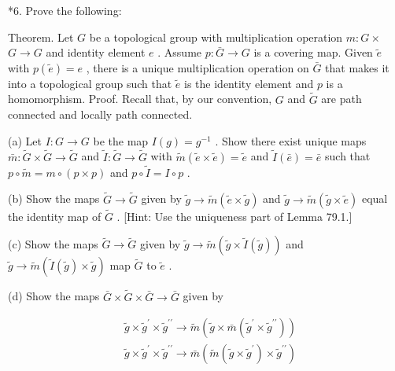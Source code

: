 *6. Prove the following:

Theorem. Let \(G\) be a topological group with multiplication operation \(m : G \times\)  \(G \rightarrow  G\) and identity element \(e\) . Assume \(p : \bar{G} \rightarrow  G\) is a covering map. Given \(\widetilde{e}\) with \(p\left( \widetilde{e}\right)  = e\) , there is a unique multiplication operation on \(\bar{G}\) that makes it into a topological group such that \(\widetilde{e}\) is the identity element and \(p\) is a homomorphism. Proof. Recall that, by our convention, \(G\) and \(\widetilde{G}\) are path connected and locally path connected.

(a) Let \(I : G \rightarrow  G\) be the map \(I\left( g\right)  = {g}^{-1}\) . Show there exist unique maps \(\bar{m} : \widetilde{G} \times  \widetilde{G} \rightarrow  \widetilde{G}\) and \(\widetilde{I} : \widetilde{G} \rightarrow  \widetilde{G}\) with \(\widetilde{m}\left( {\widetilde{e} \times  \widetilde{e}}\right)  = \widetilde{e}\) and \(\widetilde{I}\left( \bar{e}\right)  = \bar{e}\) such that \(p \circ  \widetilde{m} = m \circ  \left( {p \times  p}\right)\) and \(p \circ  \widetilde{I} = I \circ  p\) .

(b) Show the maps \(\widetilde{G} \rightarrow  \widetilde{G}\) given by \(\widetilde{g} \rightarrow  \widetilde{m}\left( {\widetilde{e} \times  \widetilde{g}}\right)\) and \(\widetilde{g} \rightarrow  \widetilde{m}\left( {\widetilde{g} \times  \widetilde{e}}\right)\) equal the identity map of \(\widetilde{G}\) . [Hint: Use the uniqueness part of Lemma 79.1.]

(c) Show the maps \(\widetilde{G} \rightarrow  \widetilde{G}\) given by \(\widetilde{g} \rightarrow  \widetilde{m}\left( {\widetilde{g} \times  \widetilde{I}\left( \widetilde{g}\right) }\right)\) and \(\widetilde{g} \rightarrow  \widetilde{m}\left( {\widetilde{I}\left( \widetilde{g}\right)  \times  \widetilde{g}}\right)\) map \(\widetilde{G}\) to \(\widetilde{e}\) .

(d) Show the maps \(\bar{G} \times  \widetilde{G} \times  \bar{G} \rightarrow  \bar{G}\) given by

\[
\begin{aligned}  & \widetilde{g} \times  {\widetilde{g}}^{\prime } \times  {\widetilde{g}}^{\prime \prime } \rightarrow  \widetilde{m}\left( {\widetilde{g} \times  \bar{m}\left( {{\widetilde{g}}^{\prime } \times  {\widetilde{g}}^{\prime \prime }}\right) }\right) \\  & \widetilde{g} \times  {\widetilde{g}}^{\prime } \times  {\widetilde{g}}^{\prime \prime } \rightarrow  \bar{m}\left( {\widetilde{m}\left( {\widetilde{g} \times  {\widetilde{g}}^{\prime }}\right)  \times  {\widetilde{g}}^{\prime \prime }}\right) \end{aligned}
\]

